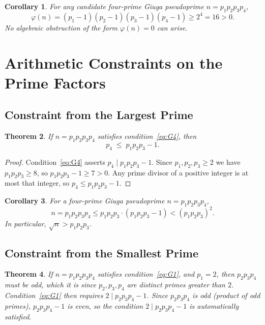 \documentclass[12pt,a4paper]{amsart}
\newtheorem{theorem}{Theorem}[section]
\newtheorem{corollary}[theorem]{Corollary}
\theoremstyle{definition}
\begin{document}
\begin{corollary}
\label{cor:phi}
For any candidate four-prime Giuga pseudoprime $n = p_1 p_2 p_3 p_4$,
\[
  \varphi(n) = (p_1 - 1)(p_2 - 1)(p_3 - 1)(p_4 - 1) \ge 2^4 = 16 > 0.
\]
No algebraic obstruction of the form $\varphi(n) = 0$ can arise.
\end{corollary}

\section{Arithmetic Constraints on the Prime Factors}
\label{sec:constraints}

\subsection{Constraint from the Largest Prime}

\begin{theorem}
\label{thm:p4bound}
If $n = p_1 p_2 p_3 p_4$ satisfies condition~\eqref{eq:G4}, then
\[
  p_4 \;\le\; p_1 p_2 p_3 - 1.
\]
\end{theorem}

\begin{proof}
Condition~\eqref{eq:G4} asserts $p_4 \mid p_1 p_2 p_3 - 1$.  Since $p_1,
p_2, p_3 \ge 2$ we have $p_1 p_2 p_3 \ge 8$, so $p_1 p_2 p_3 - 1 \ge 7 > 0$.
Any prime divisor of a positive integer is at most that integer, so
$p_4 \le p_1 p_2 p_3 - 1$.
\end{proof}

\begin{corollary}
\label{cor:size}
For a four-prime Giuga pseudoprime $n = p_1 p_2 p_3 p_4$,
\[
  n = p_1 p_2 p_3 p_4 \le p_1 p_2 p_3 \cdot (p_1 p_2 p_3 - 1) < (p_1 p_2 p_3)^2.
\]
In particular, $\sqrt{n} > p_1 p_2 p_3$.
\end{corollary}

\subsection{Constraint from the Smallest Prime}

\begin{theorem}
\label{thm:p1mod}
If $n = p_1 p_2 p_3 p_4$ satisfies condition~\eqref{eq:G1}, and $p_1 = 2$, then
$p_2 p_3 p_4$ must be odd, which it is since $p_2, p_3, p_4$ are distinct primes
greater than $2$.  Condition~\eqref{eq:G1} then requires $2 \mid p_2 p_3 p_4 - 1$.
Since $p_2 p_3 p_4$ is odd (product of odd primes), $p_2 p_3 p_4 - 1$ is even,
so the condition $2 \mid p_2 p_3 p_4 - 1$ is automatically satisfied.
\end{theorem}
\end{document}
